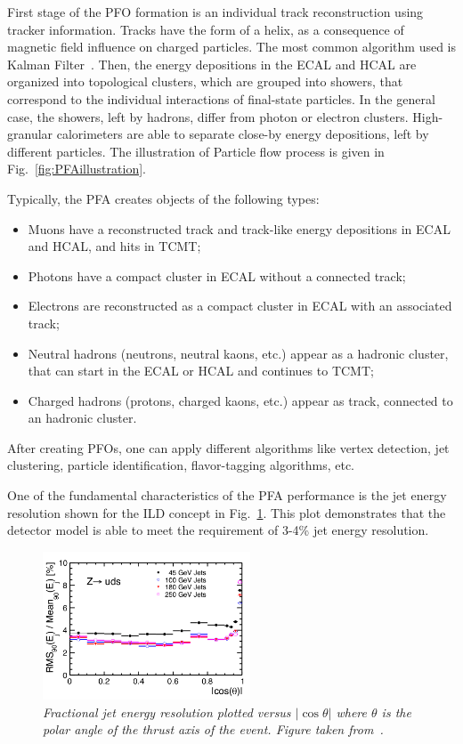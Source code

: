 First stage of the PFO formation is an individual track reconstruction using tracker information. Tracks have the form of a helix, as a consequence of magnetic field influence on charged particles.  The most common algorithm used is Kalman Filter~\cite{Fruhwirth:1987fm}.
Then, the energy depositions in the ECAL and HCAL are organized into topological clusters, which are grouped into showers, that correspond to the individual interactions of final-state particles. 
In the general case, the showers, left by hadrons, differ from photon or electron clusters. %
High-granular calorimeters are able to separate close-by energy depositions, left by different particles. The illustration of Particle flow process is given in Fig.~\ref{fig:PFAillustration}.

Typically, the PFA creates objects of the following types:
\begin{itemize}
\item Muons have a reconstructed track and track-like energy depositions in ECAL and HCAL, and hits in TCMT;
\item Photons have a compact cluster in ECAL without a connected track;
\item Electrons are reconstructed as a compact cluster in ECAL with an associated track;

\item Neutral hadrons (neutrons, neutral kaons, etc.) appear as a hadronic cluster, that can start in the ECAL or HCAL and continues to TCMT;
\item Charged hadrons (protons, charged kaons, etc.) appear as track, connected to an hadronic cluster.
\end{itemize}

After creating PFOs, one can apply different algorithms like vertex detection, jet clustering, particle identification, flavor-tagging algorithms, etc.

One of the fundamental characteristics of the PFA performance is the jet energy resolution shown for the ILD concept in Fig.~\ref{fig:ILCjetrms}. This plot demonstrates that the detector model is able to meet the requirement of 3-4\% jet energy resolution.

\begin{figure}[H]
{\centering
    \includegraphics[width=0.55\textwidth]{graphics/ILCjetrms.png}
    \caption{\sl Fractional jet energy resolution plotted versus $|\cos\theta|$ where $\theta$ is the polar angle of the thrust axis of the event. Figure taken from~\cite{bib:ILC}.}
    \label{fig:ILCjetrms}
  }
\end{figure}


